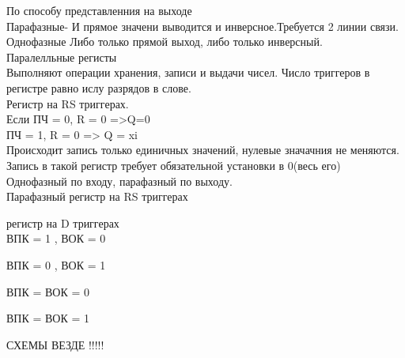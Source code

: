 По способу представленния на выходе\\
Парафазные-
И прямое значени выводится и инверсное.Требуется 2 линии связи.\\
Однофазные
Либо только прямой выход, либо только инверсный.\\

Паралелльные регисты\\
Выполняют операции хранения, записи и выдачи чисел. Число триггеров в регистре равно ислу разрядов в слове.\\

Регистр на RS триггерах.\\
Если ПЧ = 0, R = 0 =>Q=0\\
ПЧ = 1, R = 0 => Q = xi\\
Происходит запись только единичных значений, нулевые значачния не меняются. \\
Запись в такой регистр требует обязательной установки в 0(весь его)\\
Однофазный по входу, парафазный по выходу.\\

Парафазный регистр на RS триггерах

 регистр на D триггерах\\
ВПК = 1 , ВОК = 0

ВПК = 0 , ВОК = 1

ВПК =  ВОК = 0

ВПК =  ВОК = 1

СХЕМЫ ВЕЗДЕ !!!!!

